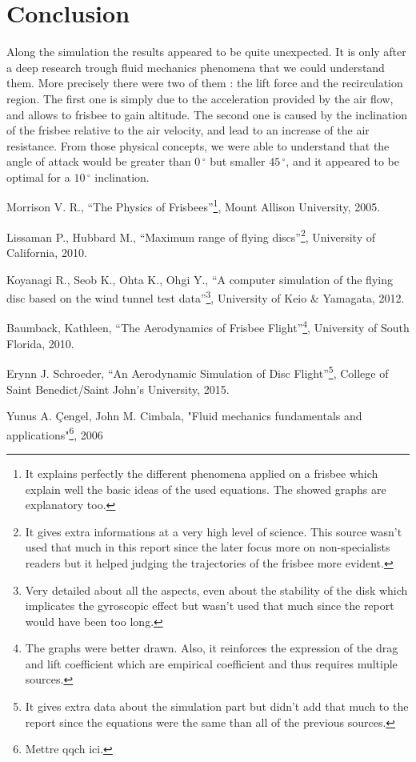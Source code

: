 \documentclass[10pt,a4paper]{report}
\begin{document}
\section{Conclusion}
Along the simulation the results appeared to be quite unexpected. It is only after a deep research trough fluid mechanics phenomena that we could understand them. More precisely there were two of them : the lift force and the recirculation region. The first one is simply due to the acceleration provided by the air flow, and allows to frisbee to gain altitude. The second one is caused by the inclination of the frisbee relative to the air velocity, and lead to an increase of the air resistance. From those physical concepts, we were able to understand that the angle of attack would be greater than $0\,^{\circ}$ but smaller $45\,^{\circ}$, and it appeared to be optimal for a $10\,^{\circ}$ inclination.


\begin{thebibliography}{9}
  
  Morrison V. R.,
  “The Physics of Frisbees”\footnote{It explains perfectly the different phenomena applied on a frisbee which explain well the basic ideas of the used equations. The showed graphs are explanatory too.},
  Mount Allison University,
  2005.

  Lissaman P., Hubbard M.,
  “Maximum range of flying discs”\footnote{It gives extra informations at a very high level of science. This source wasn't used that much in this report since the later focus more on non-specialists readers but it helped judging the trajectories of the frisbee more evident.},
  University of California,
  2010.
  
  Koyanagi R., Seob K., Ohta K., Ohgi Y.,
  “A computer simulation of the flying disc based on the wind tunnel test data”\footnote{Very detailed about all the aspects, even about the stability of the disk which implicates the gyroscopic effect but wasn't used that much since the report would have been too long.},
  University of Keio \& Yamagata,
  2012.
  
  Baumback, Kathleen,
  “The Aerodynamics of Frisbee Flight”\footnote{The graphs were better drawn. Also, it reinforces the expression of the drag and lift coefficient which are empirical coefficient and thus requires multiple sources.},
  University of South Florida,
  2010.
  
  Erynn J. Schroeder,
  “An Aerodynamic Simulation of Disc Flight”\footnote{It gives extra data about the simulation part but didn't add that much to the report since the equations were the same than all of the previous sources.},
  College of Saint Benedict/Saint John's University,
  2015.
  
  Yunus A. \c{C}engel, John M. Cimbala,
  "Fluid mechanics fundamentals and applications"\footnote{Mettre qqch ici.},
  2006

\end{thebibliography}
\end{document}
